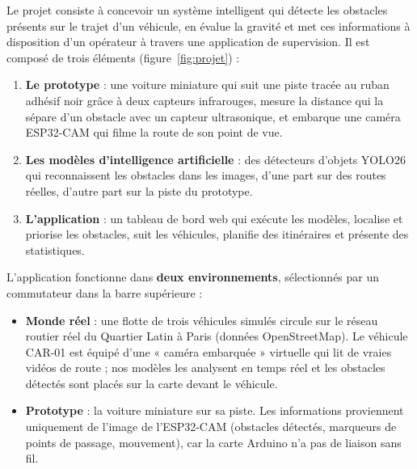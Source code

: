 Le projet consiste à concevoir un système intelligent qui détecte les obstacles présents sur le trajet d'un
véhicule, en évalue la gravité et met ces informations à disposition d'un opérateur à travers une application de
supervision. Il est composé de trois éléments (figure~\ref{fig:projet}) :
\begin{enumerate}
  \item \textbf{Le prototype} : une voiture miniature qui suit une piste tracée au ruban adhésif noir grâce à deux
        capteurs infrarouges, mesure la distance qui la sépare d'un obstacle avec un capteur ultrasonique, et
        embarque une caméra ESP32-CAM qui filme la route de son point de vue.
  \item \textbf{Les modèles d'intelligence artificielle} : des détecteurs d'objets YOLO26 qui reconnaissent les
        obstacles dans les images, d'une part sur des routes réelles, d'autre part sur la piste du prototype.
  \item \textbf{L'application \app} : un tableau de bord web qui exécute les modèles, localise et priorise les
        obstacles, suit les véhicules, planifie des itinéraires et présente des statistiques.
\end{enumerate}

L'application fonctionne dans \textbf{deux environnements}, sélectionnés par un commutateur dans la barre
supérieure :
\begin{itemize}
  \item \textbf{Monde réel} : une flotte de trois véhicules simulés circule sur le réseau routier réel du Quartier
        Latin à Paris (données OpenStreetMap). Le véhicule CAR-01 est équipé d'une « caméra embarquée » virtuelle
        qui lit de vraies vidéos de route ; nos modèles les analysent en temps réel et les obstacles détectés sont
        placés sur la carte devant le véhicule.
  \item \textbf{Prototype} : la voiture miniature sur sa piste. Les informations proviennent uniquement de
        l'image de l'ESP32-CAM (obstacles détectés, marqueurs de points de passage, mouvement), car la carte
        Arduino n'a pas de liaison sans fil.
\end{itemize}

